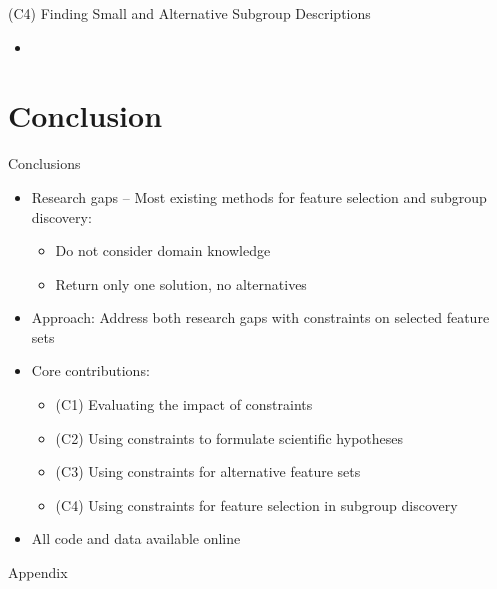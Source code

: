 \documentclass[en, navbarinline, handout]{sdqbeamer}
\begin{document}
\begin{frame}[t]{(C4) Finding Small and Alternative Subgroup Descriptions}
	\begin{itemize}
		\item
	\end{itemize}
\end{frame}

\section{Conclusion}

\begin{frame}[t]{Conclusions}
	\begin{itemize}
		\item Research gaps -- Most existing methods for feature selection and subgroup discovery:
		\begin{itemize}
			\item Do not consider domain knowledge
			\item Return only one solution, no alternatives
		\end{itemize}
		\pause
		\vspace{\baselineskip}
		\item Approach: Address both research gaps with constraints on selected feature sets
		\pause
		\vspace{\baselineskip}
		\item Core contributions:
		\begin{itemize}
			\item (C1) Evaluating the impact of constraints \cite{bach2022empirical}
			\item (C2) Using constraints to formulate scientific hypotheses \cite{bach2022empirical}
			\item (C3) Using constraints for alternative feature sets \cite{bach2023finding, bach2024alternative}
			\item (C4) Using constraints for feature selection in subgroup discovery \cite{bach2025subgroup, bach2024using}
		\end{itemize}
		\item All code and data available online
	\end{itemize}
\end{frame}

\appendix
\beginbackup %

\begin{frame}[plain]
	\centering
	\Huge Appendix
\end{frame}
\end{document}
